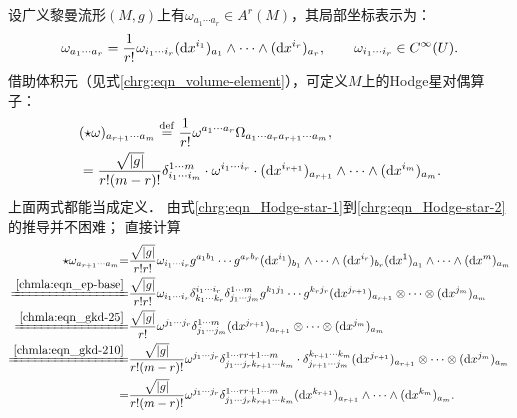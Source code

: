 设广义黎曼流形$(M,g)$上有$\omega_{a_1 \cdots a_r}\in A^r(M)$，其局部坐标表示为：
\begin{equation}
    \omega_{a_1 \cdots a_r}= \frac{1}{r!}\omega_{i_1\cdots i_r} ({\rm d}x^{i_1})_{a_1} \wedge \cdots
      \wedge({\rm d}x^{i_r})_{a_r}, \qquad \omega_{i_1\cdots i_r} \in C^\infty(U) .
\end{equation}
借助体积元（见式\eqref{chrg:eqn_volume-element}），可定义$M$上的Hodge星对偶算子：
\begin{subequations}\label{chrg:eqn_Hodge-star}
\begin{align}
    &(\star \omega) _{ a_{r+1}  \cdots a_m} \overset{\mathrm {def}}{=} 
    \frac{1}{r!} \omega^{a_1 \cdots a_r} \Omega_{a_1 \cdots a_r a_{r+1} \cdots a_m},
      \label{chrg:eqn_Hodge-star-1} \\
    &= \frac{\sqrt{|g|}}{r! (m-r)!} \delta_{i_{1} \cdots i_m}^{1 \cdots m}
      \cdot \omega^{i_1\cdots i_r}\cdot   ({\rm d}x^{i_{r+1}})_{a_{r+1}} \wedge
     \cdots \wedge({\rm d}x^{i_m})_{a_m} . \label{chrg:eqn_Hodge-star-2}
\end{align}
\end{subequations}
上面两式都能当成定义．
由式\eqref{chrg:eqn_Hodge-star-1}到\eqref{chrg:eqn_Hodge-star-2}的推导并不困难；
直接计算
\begin{align*}
    \star \omega _{a_{r+1} \cdots a_m} {=}  &
    \frac{\sqrt{|g|}}{r! r!} \omega_{i_1\cdots i_r} g^{a_1 b_1}\cdots g^{a_r b_r}
    ({\rm d}x^{i_1})_{b_1} \wedge \cdots \wedge({\rm d}x^{i_r})_{b_r}
    ({\rm d}x^1)_{a_1} \wedge \cdots \wedge({\rm d}x^m)_{a_m} \\
    \xlongequal{\ref{chmla:eqn_ep-base}}& \frac{\sqrt{|g|}}{r! r!} \omega_{i_1\cdots i_r}
    \delta^{i_1 \cdots i_r}_{k_1 \cdots k_r}  \delta_{j_1 \cdots j_m}^{1 \cdots m}
     g^{k_1 j_1}\cdots g^{k_r j_r}
     ({\rm d}x^{j_{r+1}})_{a_{r+1}} \otimes \cdots \otimes ({\rm d}x^{j_m})_{a_m}  \\
     \xlongequal{\ref{chmla:eqn_gkd-25}}& \frac{\sqrt{|g|}}{r!} \omega^{j_1\cdots j_r}
      \delta_{j_1 \cdots j_m}^{1 \cdots m}
     ({\rm d}x^{j_{r+1}})_{a_{r+1}} \otimes \cdots \otimes ({\rm d}x^{j_m})_{a_m}  \\
     \xlongequal{\ref{chmla:eqn_gkd-210}}&
     \frac{\sqrt{|g|}}{r! (m-r)!} \omega^{j_1\cdots j_r}
     \delta_{j_1 \cdots j_r k_{r+1}\cdots k_m}^{1 \cdots r {r+1}\cdots m}
     \cdot \delta^{k_{r+1} \cdots k_m}_{j_{r+1} \cdots j_m}
     ({\rm d}x^{j_{r+1}})_{a_{r+1}} \otimes \cdots \otimes ({\rm d}x^{j_m})_{a_m}  \\
     =&\frac{\sqrt{|g|}}{r! (m-r)!} \omega^{j_1\cdots j_r}
     \delta_{j_1 \cdots j_r k_{r+1}\cdots k_m}^{1 \cdots r {r+1}\cdots m}
     ({\rm d}x^{k_{r+1}})_{a_{r+1}} \wedge \cdots \wedge ({\rm d}x^{k_m})_{a_m}  .
\end{align*}  %
